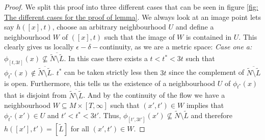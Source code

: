 \begin{proof}
We split this proof into three different cases that can be seen in figure \ref{fig: The different cases for the proof of lemma}. We always look at an image point lets say $h([x],t)$, choose an arbitrary neighbourhood $U$ and define a neighbourhood $W$ of $([x],t)$ such that the image of $W$ is contained in $U$. This clearly gives us locally $\epsilon-\delta-$continuity, as we are a metric space: 
\newline \textit{Case one a:} $\phi_{[t,3t]}(x)\not \subseteq \overline{\tilde{N}\setminus \tilde{L}}$. In this case there exists a ${t<t^*<3t}$ such that ${\phi_{t^*}(x)\nin \overline{\tilde{N}\setminus \tilde L}}$. $t^*$ can be taken strictly less then $3t$ since the complement of $\overline{\tilde{N}\setminus \tilde{L}}$ is open. Furthermore, this tells us the existence of a neighbourhood $U$ of $\phi_{t^*}(x)$ that is disjoint from $\overline{\tilde{N}\setminus \tilde{L}}$. And by the continuity of the flow we have a neighbourhood $W\subseteq M \times [T,\infty]$ such that $(x',t')\in W$ implies that $\phi_{t^*}(x')\in U$ and $t'<t^*<3t'$. Thus, $\phi_{[t',3t']}(x')\not \subseteq \tilde{N}\setminus \tilde{L}$ and therefore $h([x'],t')=[\tilde{L}]$ for all $(x',t')\in W$.


\end{proof}
